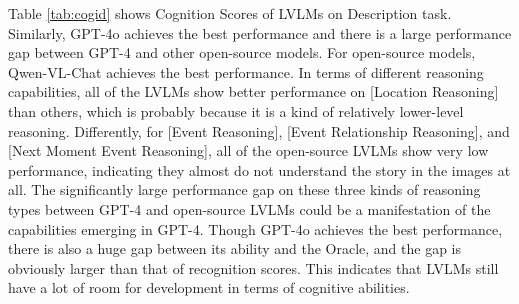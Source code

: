 Table \ref{tab:cogid} shows Cognition Scores of LVLMs on Description task. 
Similarly, GPT-4o achieves the best performance and there is a large performance gap between GPT-4 and other open-source models. 
For open-source models, Qwen-VL-Chat achieves the best performance.
In terms of different reasoning capabilities, all of the LVLMs show better performance on [Location Reasoning] than others, which is probably because it is a kind of relatively lower-level reasoning.
Differently, for [Event Reasoning], [Event Relationship Reasoning], and [Next Moment Event Reasoning], all of the open-source LVLMs show very low performance, indicating they almost do not understand the story in the images at all.
The significantly large performance gap on these three kinds of reasoning types between GPT-4 and open-source LVLMs could be a manifestation of the capabilities emerging in GPT-4.
Though GPT-4o achieves the best performance, there is also a huge gap between its ability and the Oracle, and the gap is obviously larger than that of recognition scores.
This indicates that LVLMs still have a lot of room for development in terms of cognitive abilities.





